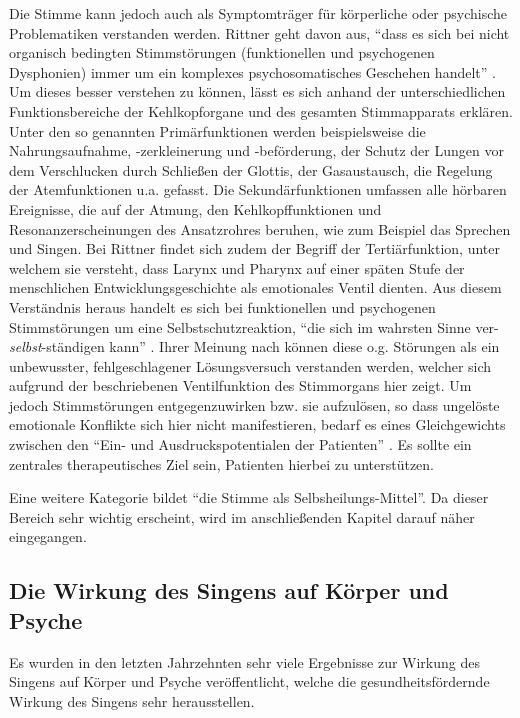 Die Stimme kann jedoch auch als Symptomträger für körperliche oder psychische Problematiken verstanden werden. Rittner geht davon aus, "`dass es sich bei nicht organisch bedingten Stimmstörungen (funktionellen und psychogenen Dysphonien) immer um ein komplexes psychosomatisches Geschehen handelt"' \autocite[212f.]{rittner2008}. Um dieses besser verstehen zu können, lässt es sich anhand der unterschiedlichen Funktionsbereiche der Kehlkopforgane und des gesamten Stimmapparats erklären. Unter den so genannten Primärfunktionen werden beispielsweise die Nahrungsaufnahme, -zerkleinerung und -beförderung, der Schutz der Lungen vor dem Verschlucken durch Schließen der Glottis, der Gasaustausch, die Regelung der Atemfunktionen u.a. gefasst. Die Sekundärfunktionen umfassen alle hörbaren Ereignisse, die auf der Atmung, den Kehlkopffunktionen und Resonanzerscheinungen des Ansatzrohres beruhen, wie zum Beispiel das Sprechen und Singen. Bei Rittner findet sich zudem der Begriff der Tertiärfunktion, unter welchem sie versteht, dass Larynx und Pharynx auf einer späten Stufe der menschlichen Entwicklungsgeschichte als emotionales Ventil dienten. Aus diesem Verständnis heraus handelt es sich bei funktionellen und psychogenen Stimmstörungen um eine Selbstschutzreaktion, "`die sich im wahrsten Sinne ver-\emph{selbst}-ständigen kann"' \autocite[213]{rittner2008}. Ihrer Meinung nach können diese o.g. Störungen als ein unbewusster, fehlgeschlagener Lösungsversuch verstanden werden, welcher sich aufgrund der beschriebenen Ventilfunktion des Stimmorgans hier zeigt. Um jedoch Stimmstörungen entgegenzuwirken bzw. sie aufzulösen, so dass ungelöste emotionale Konflikte sich hier nicht manifestieren, bedarf es eines Gleichgewichts zwischen den "`Ein- und Ausdruckspotentialen der Patienten"' \autocite[64]{rittner2012}. Es sollte ein zentrales therapeutisches Ziel sein, Patienten hierbei zu unterstützen. 

Eine weitere Kategorie bildet "`die Stimme als Selbsheilungs-Mittel"'. Da dieser Bereich sehr wichtig erscheint, wird im anschließenden Kapitel darauf näher eingegangen.

\subsection{Die Wirkung des Singens auf Körper und Psyche} 
\label{wirkung_des_singens}
Es wurden in den letzten Jahrzehnten sehr viele Ergebnisse zur Wirkung des Singens auf Körper und Psyche veröffentlicht, welche die gesundheitsfördernde Wirkung des Singens sehr herausstellen.

